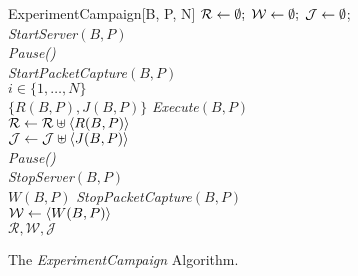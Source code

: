 \documentclass{sig-alternate}
\begin{document}
\begin{figure}


 \begin{center}
      \begin{algorithm}{ExperimentCampaign}[B, P, N]
        { 
        } 
    $\mathcal{R} \mathrel{\leftarrow} \emptyset; \; \mathcal{W} \mathrel{\leftarrow} \emptyset; \; \mathcal{J} \mathrel{\leftarrow} \emptyset$; \label{init}\\	
    \mbox{{\em StartServer}}$(B,P)$ \label{start}\\
    \mbox{{\em Pause()}} \label{pause1} \\
    \mbox{{\em StartPacketCapture}}$(B,P)$ \label{packstart} \\
    \qfor $i \in \{1, \ldots, N\}$ \label{for} \\
    \qdo $\{R(B,P), J(B,P)\}$ \qlet \mbox{{\em Execute}}$(B,P)$ \label{exec} \\
    $\mathcal{R} \mathrel{\leftarrow} \mathcal{R} \uplus \langle R(B,P) \rangle$ \label{storeR} \\
    $\mathcal{J} \mathrel{\leftarrow} \mathcal{J} \uplus \langle J(B,P) \rangle$ \label{storeJ} \\
    \mbox{{\em Pause()}} \label{pause2} \qrof \\
    \mbox{{\em StopServer}}$(B,P)$ \label{stop} \\  
    $W(B,P)$ \qlet \mbox{{\em StopPacketCapture}}$(B,P)$ \label{packstop} \\
    $\mathcal{W} \mathrel{\leftarrow} \langle W(B,P) \rangle$ \label{storeW} \\
    \qreturn $\mathcal{R},\mathcal{W},\mathcal{J}$ \label{return}
  \end{algorithm}
  \end{center}
\vspace*{-.15in}
\caption{The {\em ExperimentCampaign} Algorithm.}

\label{fig:experiment-campaign}
\vspace*{-.2in}
\end{figure}
\end{document}
